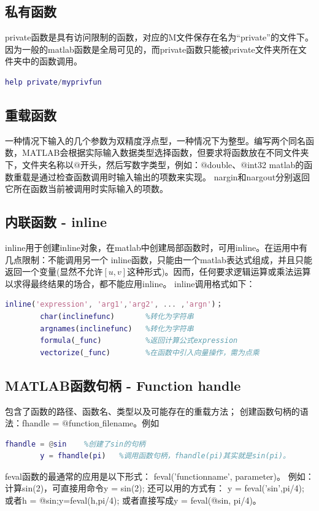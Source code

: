     \subsection{私有函数}
        private函数是具有访问限制的函数，对应的M文件保存在名为“private”的文件下。因为一般的matlab函数是全局可见的，而private函数只能被private文件夹所在文件夹中的函数调用。
        \begin{lstlisting}[language=Matlab]
        help private/myprivfun
        \end{lstlisting}
    \subsection{重载函数}
        一种情况下输入的几个参数为双精度浮点型，一种情况下为整型。编写两个同名函数，MATLAB会根据实际输入数据类型选择函数，但要求将函数放在不同文件夹下，文件夹名称以$@$开头，然后写数字类型，例如：$@$double、$@$int32
        matlab的函数重载是通过检查函数调用时输入输出的项数来实现。
        nargin和nargout分别返回它所在函数当前被调用时实际输入的项数。
    \subsection{内联函数 - inline}
        inline用于创建inline对象，在matlab中创建局部函数时，可用inline。在运用中有几点限制：不能调用另一个 inline函数，只能由一个matlab表达式组成，并且只能返回一个变量(显然不允许$[u,v]$这种形式)。因而，任何要求逻辑运算或乘法运算以求得最终结果的场合，都不能应用inline。
        inline调用格式如下：
        \begin{lstlisting}[language=Matlab]
        inline('expression', 'arg1','arg2', ... ,'argn')；
        char(inclinefunc)       %转化为字符串
        argnames(inclinefunc)   %转化为字符串
        formula(_func)          %返回计算公式expression
        vectorize(_func)        %在函数中引入向量操作，需为点乘
        \end{lstlisting}
    \subsection{MATLAB函数句柄 - Function handle }
        包含了函数的路径、函数名、类型以及可能存在的重载方法；
        创建函数句柄的语法：fhandle = $@$function$\_$filename。例如
        \begin{lstlisting}[language=Matlab]
        fhandle = @sin    %创建了sin的句柄
        y = fhandle(pi)   %调用函数句柄，fhandle(pi)其实就是sin(pi)。
        \end{lstlisting}
        \par
        feval函数的最通常的应用是以下形式：
        feval('functionname', parameter)。
        例如：计算sin(2)，可直接用命令y = sin(2);
        还可以用的方式有：
        y = feval('sin',pi/4); 或者h = @sin;y=feval(h,pi/4); 或者直接写成y = feval(@sin, pi/4)。

